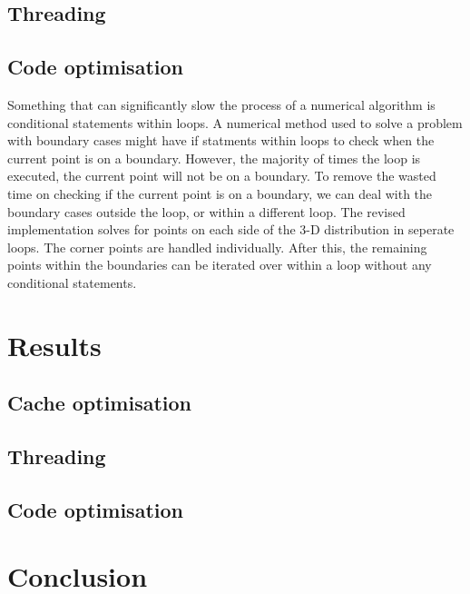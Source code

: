 \documentclass[a4paper, 12pt]{article}
\begin{document}
%

\subsection{Threading}

\subsection{Code optimisation}
Something that can significantly slow the process of a numerical algorithm is conditional statements within loops. A numerical method used to solve a problem with boundary cases might have if statments within loops to check when the current point is on a boundary. However, the majority of times the loop is executed, the current point will not be on a boundary. To remove the wasted time on checking if the current point is on a boundary, we can deal with the boundary cases outside the loop, or within a different loop. The revised implementation solves for points on each side of the 3-D distribution in seperate loops. The corner points are handled individually. After this, the remaining points within the boundaries can be iterated over within a loop without any conditional statements. 


\section{Results}
\subsection{Cache optimisation}


\subsection{Threading}


\subsection{Code optimisation}
	
	
\section{Conclusion}
	
\end{document}
